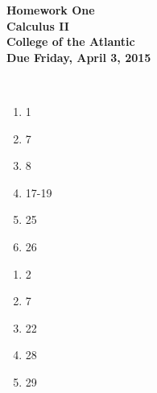 \documentclass[12pt]{article}
\begin{document}
\pagestyle{empty}
 
\begin{center}
{\LARGE {\bf Homework One}}\\
\bigskip
{\Large {\bf Calculus II}}\\
\bigskip
{\Large {\bf College of the Atlantic}}\\
\bigskip
{ {\bf Due Friday, April 3, 2015}}\\ 
\end{center}

\hspace{2mm}\\


\begin{enumerate}
\setlength{\itemsep}{-1mm}
  \item 1
  \item 7
  \item 8
  \item 17-19
  \item 25
  \item 26 

\end{enumerate}



\begin{enumerate}
\setlength{\itemsep}{-1mm}
  \item 2
  \item 7
  \item 22
  \item 28
  \item 29

\end{enumerate}
\end{document}
